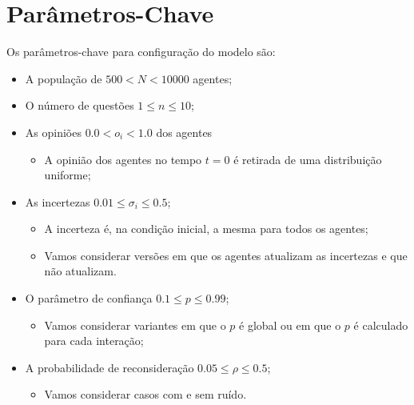 \section{Parâmetros-Chave}
Os parâmetros-chave para configuração do modelo são:
\begin{itemize}
\item A população de \(500 < N < 10000\) agentes;
\item O número de questões \(1 \leq n \leq 10\); 
\item As opiniões \(0.0< o_i< 1.0\) dos agentes
  \begin{itemize}
  \item A opinião dos agentes no tempo \(t = 0\) é retirada de uma distribuição
    uniforme;
  \end{itemize}
\item As incertezas \(0.01 \leq \sigma_i \leq 0.5\);
  \begin{itemize}
  \item A incerteza é, na condição inicial, a mesma para todos os agentes;
  \item Vamos considerar versões em que os agentes atualizam as incertezas e que
    não atualizam.
  \end{itemize}

\item O parâmetro de confiança \(0.1 \leq p \leq 0.99\);
  \begin{itemize}
  \item Vamos considerar variantes em que o \(p\) é global ou em que o \(p\) é
    calculado para cada interação;
  \end{itemize}
  
\item A probabilidade de reconsideração \(0.05 \leq \rho  \leq 0.5\);
  \begin{itemize}
  \item Vamos considerar casos com e sem ruído.
  \end{itemize}
\end{itemize}

























